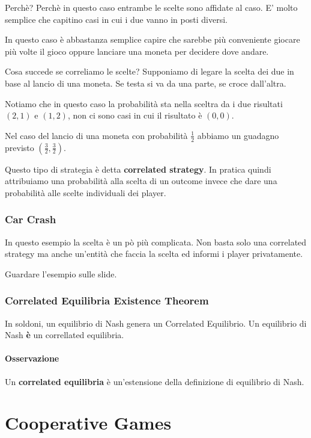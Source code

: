 \documentclass[10pt,a4paper]{report}
\begin{document}
        Perchè? Perchè in questo caso entrambe le scelte sono affidate al caso. E' molto semplice che capitino casi in cui i due vanno in posti diversi.

        In questo caso è abbastanza semplice capire che sarebbe più conveniente giocare più volte il gioco oppure lanciare una moneta per decidere dove andare.

        Cosa succede se correliamo le scelte? Supponiamo di legare la scelta dei due in base al lancio di una moneta. Se testa si va da una parte, se croce dall'altra.

        Notiamo che in questo caso la probabilità sta nella sceltra da i due risultati $(2,1)$ e $(1,2)$, non ci sono casi in cui il risultato è $(0,0)$.

        Nel caso del lancio di una moneta con probabilità $\frac{1}{2}$ abbiamo un guadagno previsto $(\frac{3}{2},\frac{3}{2})$.

        Questo tipo di strategia è detta \textbf{correlated strategy}. In pratica quindi attribuiamo una probabilità alla scelta di un outcome invece che dare una probabilità alle scelte individuali dei player.

        \subsection{Car Crash}

        In questo esempio la scelta è un pò più complicata. Non basta solo una correlated strategy ma anche un'entità che faccia la scelta ed informi i player privatamente.

        Guardare l'esempio sulle slide.

        \subsection{Correlated Equilibria Existence Theorem}

        In soldoni, un equilibrio di Nash genera un Correlated Equilibrio. Un equilibrio di Nash \textbf{è} un correllated equilibria.

        \subsubsection{Osservazione}

        Un \textbf{correlated equilibria} è un'estensione della definizione di equilibrio di Nash.

        \chapter{Cooperative Games}
\end{document}
